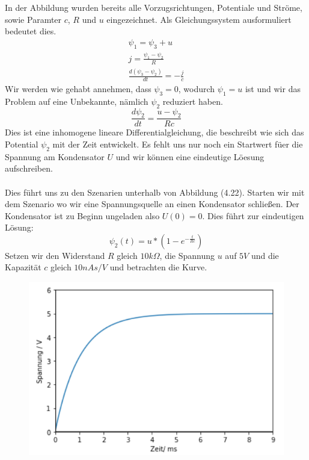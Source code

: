 \documentclass[11pt,a4paper,leqno]{report}
\numberwithin{equation}{chapter}
\begin{document}
 \noindent
 In der Abbildung wurden bereits alle Vorzugsrichtungen, Potentiale und Str\"ome, sowie Paramter $c$, $R$ und $u$ eingezeichnet. Als Gleichungssystem ausformuliert bedeutet dies.
 \begin{align} 
 	\psi_1 = \psi_3 + u\\
	j = \frac{\psi_1 - \psi_2}{R}\\
	\frac{d(\psi_3 - \psi_2)}{dt} = - \frac{j}{c}
 \end{align}
Wir werden wie gehabt annehmen, dass $\psi_3 = 0$, wodurch $\psi_1 = u$ ist und wir das Problem auf eine Unbekannte, n\"amlich $\psi_2$ reduziert haben.
\begin{equation}
	\frac{d\psi_2}{dt} = \frac{u - \psi_2}{R c}
\end{equation}
Dies ist eine inhomogene lineare Differentialgleichung, die beschreibt wie sich das Potential $\psi_2$ mit der Zeit entwickelt. Es fehlt uns nur noch ein Startwert f\"uer die Spannung am Kondensator $U$ und wir k\"onnen eine eindeutige L\"oesung aufschreiben. \\
\\
Dies f\"uhrt uns zu den Szenarien unterhalb von Abbildung (4.22). Starten wir mit dem Szenario wo wir eine Spannungsquelle an einen Kondensator schlie\ss{}en. Der Kondensator ist zu Beginn ungeladen also $U(0) = 0$.
Dies f\"uhrt zur eindeutigen L\"osung:
\begin{equation}
	\psi_2(t) = u * (1 - e^{-\frac{t}{Rc}})
\end{equation}
Setzen wir den Widerstand $R$ gleich $10k\Omega$, die Spannung $u$ auf $5V$ und die Kapazität $c$ gleich $10nAs/V$ und betrachten die Kurve.
   \begin{figure}[H]
	\begin{center}
		\includegraphics[scale=0.5]{Ladung.png}
	\end{center}
\end{figure}
\end{document}
